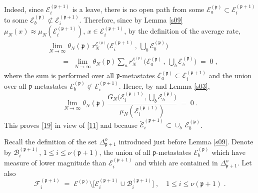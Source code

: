 \documentclass[reqno]{amsart}
\begin{document}
Indeed, since ${{\mathcal E}}^{({{\mathfrak p}} +1)}_i$ is a leave, there is no open path
from some ${{\mathcal E}}^{({{\mathfrak p}})}_a \subset {{\mathcal E}}^{({{\mathfrak p}} +1)}_i$ to some
${{\mathcal E}}^{({{\mathfrak p}})}_b\not \subset {{\mathcal E}}^{({{\mathfrak p}} +1)}_i$. Therefore, since
by Lemma \ref{s09} $\mu_N(x) \approx \mu_N({{\mathcal E}}^{({{\mathfrak p}} +1)}_i)$,
$x\in {{\mathcal E}}^{({{\mathfrak p}} +1)}_i$, by the definition of the average rate,
\begin{equation*}
\begin{split}
& \lim_{N\to\infty} \theta_N({{\mathfrak p}}) \, r^{{{\mathcal E}}^{({{\mathfrak p}})}}_N 
\Big({{\mathcal E}}^{({{\mathfrak p}} +1)}_i \,,\,\bigcup_b {{\mathcal E}}^{({{\mathfrak p}})}_b \Big)\\
&\qquad =\; \lim_{N\to\infty} \theta_N({{\mathfrak p}}) \sum_{a} r^{{{\mathcal E}}^{({{\mathfrak p}})}}_N 
\Big({{\mathcal E}}^{({{\mathfrak p}})}_a \,,\, \bigcup_b {{\mathcal E}}^{({{\mathfrak p}})}_b \Big) \;=\; 0
\; ,
\end{split}
\end{equation*}
where the sum is performed over all ${{\mathfrak p}}$-metastates ${{\mathcal E}}^{({{\mathfrak p}})}_a \subset {{\mathcal E}}^{({{\mathfrak p}} +1)}_i$ and the union over all ${{\mathfrak p}}$-metastates ${{\mathcal E}}^{({{\mathfrak p}})}_b\not \subset {{\mathcal E}}^{({{\mathfrak p}}
  +1)}_i$. Hence, by \cite[Lemma 6.7]{bl2} and Lemma \ref{s03},
\begin{equation}
\label{22}
\lim_{N\to\infty} \theta_N({{\mathfrak p}}) \, 
\frac{ G_N \Big({{\mathcal E}}^{({{\mathfrak p}} +1)}_i ,\bigcup_b {{\mathcal E}}^{({{\mathfrak p}})}_b
  \Big)}{\mu_N({{\mathcal E}}^{({{\mathfrak p}} +1)}_i)} \;=\; 0\;.
\end{equation}
This proves \eqref{19} in view of \eqref{11} and because $\breve{{{\mathcal E}}}^{({{\mathfrak p}} +1)}_i \subset \cup_b \, {{\mathcal E}}^{({{\mathfrak p}})}_b$. 

Recall the definition of the set $\Delta^o_{{{\mathfrak p}}+1}$ introduced just
before Lemma \ref{s09}. Denote by ${{\mathcal B}}^{({{\mathfrak p}} +1)}_i$, $1\le i\le
\nu({{\mathfrak p}} +1)$, the union of all ${{\mathfrak p}}$-metastates ${{\mathcal E}}^{({{\mathfrak p}})}_b$ which have measure of lower magnitude than ${{\mathcal E}}^{({{\mathfrak p}}
  +1)}_i$ and which are contained in $\Delta^o_{{{\mathfrak p}}+1}$. Let also
\begin{equation*}
{{\mathcal F}}^{({{\mathfrak p}} +1)}_i \;=\; {{\mathcal E}}^{({{\mathfrak p}})} \setminus \big[ {{\mathcal E}}^{({{\mathfrak p}} +1)}_i \cup {{\mathcal B}}^{({{\mathfrak p}}+1)}_i \big]\;, \quad 1\le i\le \nu({{\mathfrak p}}+1)
\;.
\end{equation*}
\end{document}
